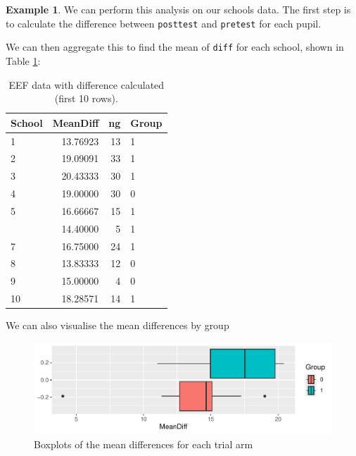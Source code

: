 \documentclass[
  openany]{book}
\newenvironment{Shaded}{\begin{snugshade}}{\end{snugshade}}
\newcommand{\NormalTok}[1]{#1}
\newcommand{\OtherTok}[1]{\textcolor[rgb]{0.56,0.35,0.01}{#1}}
\newcommand{\SpecialCharTok}[1]{\textcolor[rgb]{0.81,0.36,0.00}{\textbf{#1}}}
\theoremstyle{definition}
\theoremstyle{definition}
\newtheorem{example}{Example}[chapter]
\theoremstyle{definition}
\theoremstyle{definition}
\theoremstyle{remark}
\begin{document}
\begin{example}

We can perform this analysis on our schools data. The first step is to calculate the difference between \texttt{posttest} and \texttt{pretest} for each pupil.

\begin{Shaded}
\end{Shaded}

We can then aggregate this to find the mean of \texttt{diff} for each school, shown in Table \ref{tab:eefsum}:

\begin{table}

\caption{\label{tab:eefsum}EEF data with difference calculated (first 10 rows).}
\centering
\begin{tabular}[t]{lrrl}
\toprule
School & MeanDiff & ng & Group\\
\midrule
1 & 13.76923 & 13 & 1\\
2 & 19.09091 & 33 & 1\\
3 & 20.43333 & 30 & 1\\
4 & 19.00000 & 30 & 0\\
5 & 16.66667 & 15 & 1\\
\addlinespace
6 & 14.40000 & 5 & 1\\
7 & 16.75000 & 24 & 1\\
8 & 13.83333 & 12 & 0\\
9 & 15.00000 & 4 & 0\\
10 & 18.28571 & 14 & 1\\
\bottomrule
\end{tabular}
\end{table}

We can also visualise the mean differences by group

\begin{figure}
\centering
\includegraphics{CT4H_notes_files/figure-latex/crt1bp-1.pdf}
\caption{\label{fig:crt1bp}Boxplots of the mean differences for each trial arm}
\end{figure}


\end{example}
\end{document}
